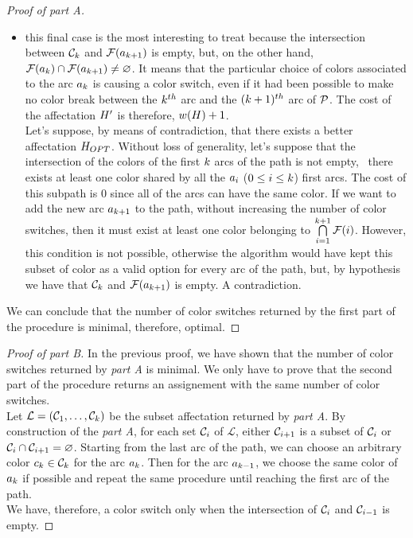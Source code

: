 \begin{proof}[Proof of \textit{part A}]
\begin{itemize}
\begin{itemize}
			      \item this final case is the most interesting to treat because the intersection between $\mathcal{C}_{k}$ and $\mathcal{F}(a_{k+1})$ is empty, but, on the other hand, $\mathcal{F}(a_{k}) \cap \mathcal{F}(a_{k+1}) \neq \varnothing$. It means that the particular choice of colors associated to the arc $a_k$ is causing a color switch, even if it had been possible to make no color break between the $k^{th}$ arc and the  $(k+1)^{th}$ arc of $\mathcal{P}$. The cost of the affectation $H'$ is therefore, $w(H) + 1$.\\
			            Let's suppose, by means of contradiction, that there exists a better affectation $H_{OPT}$. Without loss of generality, let's suppose that the intersection of the colors of the first $k$ arcs of the path is not empty, \ie\ there exists at least one color shared by all the $a_i$ ($0 \leq i \leq k$) first arcs. The cost of this subpath is $0$ since all of the arcs can have the same color. If we want to add the new arc $a_{k + 1}$ to the path, without increasing the number of color switches, then it must exist at least one color belonging to $\bigcap\limits_{i = 1}^{k + 1} \mathcal{F}(i)$. However, this condition is not possible, otherwise the algorithm would have kept this subset of color as a valid option for every arc of the path, but, by hypothesis we have that $\mathcal{C}_k$ and $\mathcal{F}(a_{k + 1})$ is empty. A contradiction.
		      \end{itemize}
	\end{itemize}
	We can conclude that the number of color switches returned by the first part of the procedure is minimal, therefore, optimal.
\end{proof}

\begin{proof}[Proof of \textit{part B}]
	In the previous proof, we have shown that the number of color switches returned by \textit{part A} is minimal. We only have to prove that the second part of the procedure returns an assignement with the same number of color switches.\\
	Let $\mathcal{L} = (\mathcal{C}_1,\ldots,\mathcal{C}_{k})$ be the subset affectation returned by \textit{part A}. By construction of the \textit{part A}, for each set $\mathcal{C}_i$ of $\mathcal{L}$, either $\mathcal{C}_{i+1}$ is a subset of $\mathcal{C}_i$ or $\mathcal{C}_i \cap \mathcal{C}_{i+1} = \varnothing$.
	Starting from the last arc of the path, we can choose an arbitrary color $c_k \in \mathcal{C}_k$ for the arc $a_k$. Then for the arc $a_{k-1}$, we choose the same color of $a_k$ if possible and repeat the same procedure until reaching the first arc of the path.\\
	We have, therefore, a color switch only when the intersection of $\mathcal{C}_i$ and $\mathcal{C}_{i-1}$ is empty.
\end{proof}


